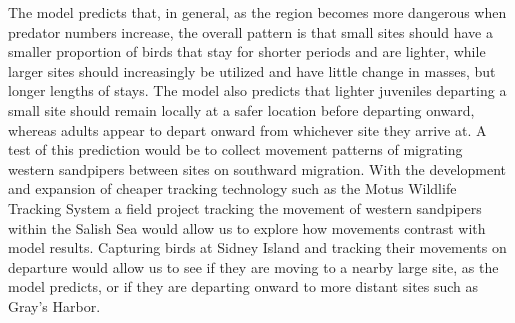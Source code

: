 

The model predicts that, in general, as the region becomes more dangerous when predator numbers increase, the overall pattern is that small sites should have a smaller proportion of birds that stay for shorter periods and are lighter, while larger sites should increasingly be utilized and have little change in masses, but longer lengths of stays. The model also predicts that lighter juveniles departing a small site should remain locally at a safer location before departing onward, whereas adults appear to depart onward from whichever site they arrive at. A test of this prediction would be to collect movement patterns of migrating western sandpipers between sites on southward migration. With the development and expansion of cheaper tracking technology such as the Motus Wildlife Tracking System \citep{MOTUS_2017} a field project tracking the movement of western sandpipers within the Salish Sea would allow us to explore how movements contrast with model results. Capturing birds at Sidney Island and tracking their movements on departure would allow us to see if they are moving to a nearby large site, as the model predicts, or if they are departing onward to more distant sites such as Gray's Harbor. 


